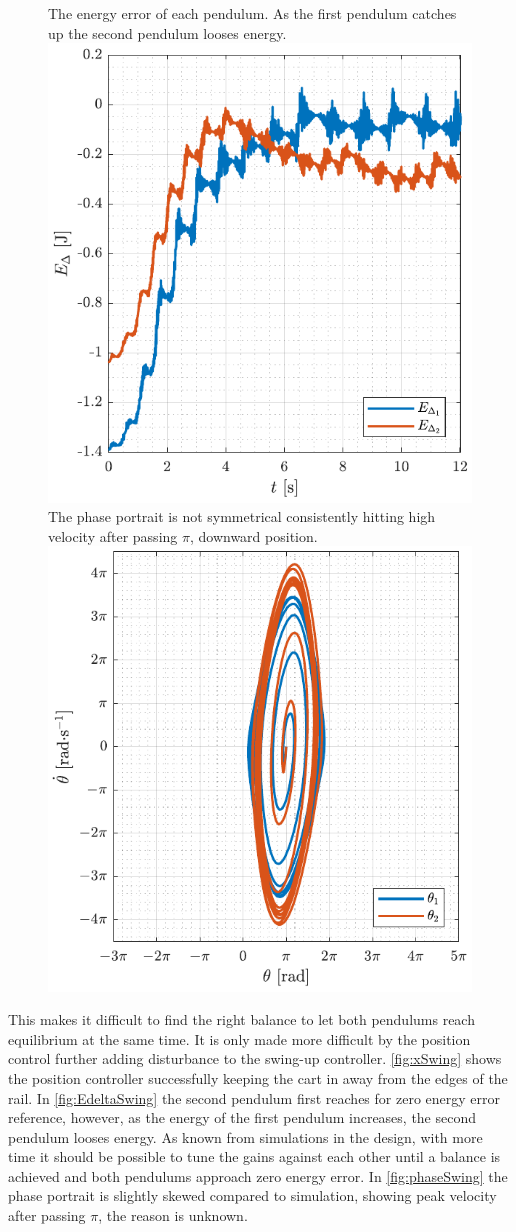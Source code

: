 \begin{figure}[H]
  \hspace{-10pt}
  \captionbox
  {
    The energy error of each pendulum. As the first pendulum catches up the second pendulum looses energy.
    \label{fig:EdeltaSwing}
  }
  {
    \hspace{-1cm}
    \includegraphics[width=.452\textwidth]{figures/EdeltaSwing}
  }
  \hspace{20pt}
  \captionbox 
  {
    The phase portrait is not symmetrical consistently hitting high velocity after passing $\pi$, downward position.
    \label{fig:phaseSwing}
  }
  {
    \hspace{-1cm}
    \includegraphics[width=.46\textwidth]{figures/phaseSwing}
  }  
\end{figure}
%
%
This makes it difficult to find the right balance to let both pendulums reach equilibrium at the same time. It is only made more difficult by the position control further adding disturbance to the swing-up controller. \autoref{fig:xSwing} shows the position controller successfully keeping the cart in away from the edges of the rail. In \autoref{fig:EdeltaSwing} the second pendulum first reaches for zero energy error reference, however, as the energy of the first pendulum increases, the second pendulum looses energy. As known from simulations in the design, with more time it should be possible to tune the gains against each other until a balance is achieved and both pendulums approach zero energy error. In \autoref{fig:phaseSwing} the phase portrait is slightly skewed compared to simulation, showing peak velocity after passing $\pi$, the reason is unknown.

